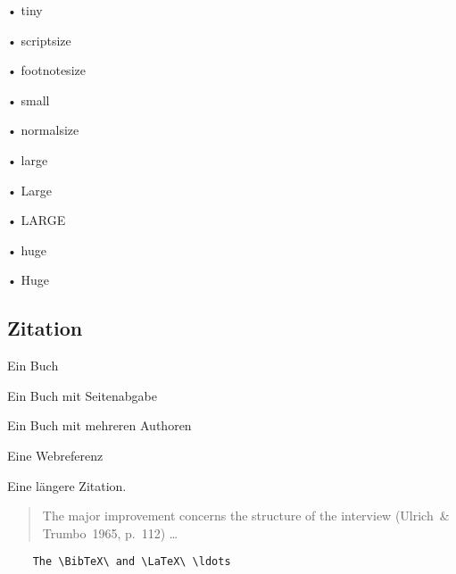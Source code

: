 \begin{tiny}
• tiny
\end{tiny}

\begin{scriptsize}
• scriptsize
\end{scriptsize}

\begin{footnotesize}
• footnotesize
\end{footnotesize}

\begin{small}
• small
\end{small}

\begin{normalsize}
• normalsize
\end{normalsize}

\begin{large}
• large
\end{large}

\begin{Large}
• Large
\end{Large}

\begin{LARGE}
• LARGE
\end{LARGE}

\begin{huge}
• huge
\end{huge}

\begin{Huge}
• Huge
\end{Huge}

\subsection{Zitation}\label{ssec:citation}

Ein Buch \cite{b:buch}\par
Ein Buch mit Seitenabgabe \cite[S. 3ff.]{b:latex}\par
Ein Buch mit mehreren Authoren \cite{b:komascript}\par
Eine Webreferenz \cite{w:website}\par
Eine längere Zitation.\par
\begin{quote}
	The major improvement concerns the structure of the interview
	(Ulrich~\& Trumbo~1965, p.~112) \ldots \par
	\blindtext
\end{quote}

\begin{verbatim}
	The \BibTeX\ and \LaTeX\ \ldots
\end{verbatim}

